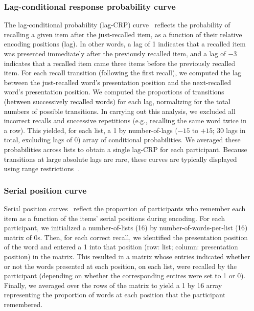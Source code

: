 \documentclass[11pt]{article}
\begin{document}
\subsubsection*{Lag-conditional response probability curve}

The lag-conditional probability (lag-CRP) curve~\citep{Kaha96} reflects the
probability of recalling a given item after the just-recalled item, as a
function of their relative encoding positions (lag). In other words, a lag of 1
indicates that a recalled item was presented immediately after the previously
recalled item, and a lag of $-3$ indicates that a recalled item came three
items before the previously recalled item. For each recall transition
(following the first recall), we computed the lag between the just-recalled
word's presentation position and the next-recalled word's presentation
position. We computed the proportions of transitions (between successively
recalled words) for each lag, normalizing for the total numbers of possible
transitions. In carrying out this analysis, we excluded all incorrect recalls
and successive repetitions (e.g., recalling the same word twice in a row). This
yielded, for each list, a 1 by number-of-lags ($-15$ to $+15$; 30 lags in
total, excluding lags of 0) array of conditional probabilities. We averaged
these probabilities across lists to obtain a single lag-CRP for each
participant. Because transitions at large absolute lags are rare, these curves
are typically displayed using range restrictions~\citep{Kaha12}.



\subsubsection*{Serial position curve}

Serial position curves~\citep{Murd62a} reflect the proportion of participants
who remember each item as a function of the items' serial positions during
encoding. For each participant, we initialized a number-of-lists (16) by
number-of-words-per-list (16) matrix of 0s. Then, for each correct recall, we
identified the presentation position of the word and entered a 1 into that
position (row: list; column: presentation position) in the matrix. This
resulted in a matrix whose entries indicated whether or not the words presented
at each position, on each list, were recalled by the participant (depending on
whether the corresponding entires were set to 1 or 0). Finally, we averaged
over the rows of the matrix to yield a 1 by 16 array representing the
proportion of words at each position that the participant remembered.
\end{document}

